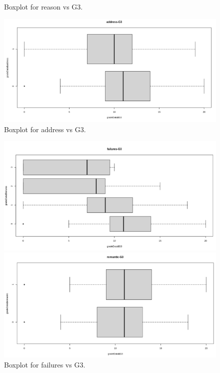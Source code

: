 \documentclass[a4paper]{article}
\begin{document}
\begin{enumerate}
\begin{figure}[H]
\begin{minipage}{0.5\textwidth}
            \caption{Boxplot for reason vs G3.}
            \label{fig:boxplot14}
        \end{minipage}%
        \begin{minipage}{0.5\textwidth}
            \centering
            \includegraphics[width = 1\linewidth]{Images/35.PNG}
            \caption{Boxplot for address vs G3.}
            \label{fig:boxplot15}
        \end{minipage}
    \end{figure}
    \begin{figure}[H]
        \centering
        \begin{minipage}{0.5\textwidth}
            \centering
            \includegraphics[width = 1\linewidth]{Images/36.PNG}
            \caption{Boxplot for failures vs G3.}
        \label{fig:boxplot16}
        \end{minipage}%
        \begin{minipage}{0.5\textwidth}
            \centering
            \includegraphics[width = 1\linewidth]{Images/37.PNG}

\end{minipage}
\end{figure}
\end{enumerate}
\end{document}
